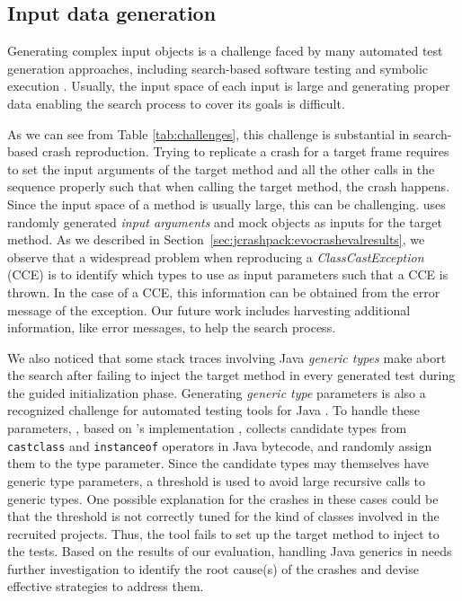 \subsection{Input data generation}

Generating complex input objects is a challenge faced by many automated test generation approaches, including search-based software testing and symbolic execution \cite{braione2017tardis}.
Usually, the input space of each input is large and generating proper data enabling the search process to cover its goals is difficult.

As we can see from Table \ref{tab:challenges}, this challenge is substantial in search-based crash reproduction.
Trying to replicate a crash for a target frame requires to set the input arguments of the target method and all the other calls in the sequence properly such that when calling the target method, the crash happens.
Since the input space of a method is usually large, this can be challenging.
\evocrash uses randomly generated \emph{input arguments} and mock objects as inputs for the target method.
As we described in Section~\ref{sec:jcrashpack:evocrashevalresults}, we observe that a widespread problem when reproducing a \textit{ClassCastException} (CCE) is to identify which types to use as input parameters such that a CCE is thrown.
In the case of a CCE, this information can be obtained from the error message of the exception. Our future work includes harvesting additional information, like error messages, to help the search process. 

We also noticed that some stack traces involving Java \emph{generic types} make \evocrash abort the search after failing to inject the target method in every generated test during the guided initialization phase.
Generating \emph{generic type} parameters is also a recognized challenge for automated testing tools for Java \cite{fraser2014automated}.
To handle these parameters, \evocrash, based on \evosuite's implementation \cite{fraser2014automated}, collects candidate types from \texttt{castclass} and \texttt{in\-stance\-of} operators in Java bytecode, and randomly assign them to the type parameter.
Since the candidate types may themselves have generic type parameters, a threshold is used to avoid large recursive calls to generic types.
One possible explanation for the crashes in these cases could be that the threshold is not correctly tuned for the kind of classes involved in the recruited projects.
Thus, the tool fails to set up the target method to inject to the tests.
Based on the results of our evaluation, handling Java generics in \evocrash needs further investigation to identify the root cause(s) of the crashes and devise effective strategies to address them.

